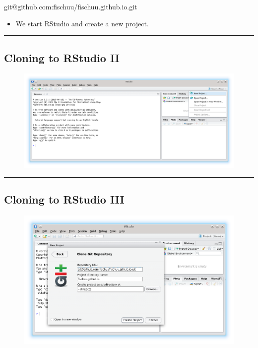 git@github.com:fischuu/fischuu.github.io.git

\begin{itemize}
\tightlist
\item
  We start RStudio and create a new project.
\end{itemize}

\begin{center}\rule{0.5\linewidth}{\linethickness}\end{center}

\subsection{Cloning to RStudio II}\label{cloning-to-rstudio-ii}

\begin{figure}[htbp]
\centering
\includegraphics{assets/img/RStudio1.png}
\caption{}
\end{figure}

\begin{center}\rule{0.5\linewidth}{\linethickness}\end{center}

\subsection{Cloning to RStudio III}\label{cloning-to-rstudio-iii}

\begin{figure}[htbp]
\centering
\includegraphics{assets/img/RStudio2.png}
\caption{}
\end{figure}

